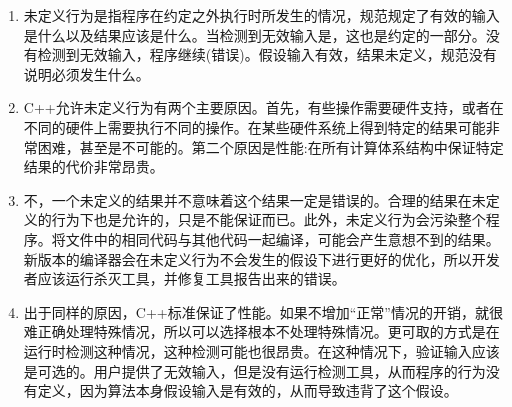 \begin{enumerate}
\item 
未定义行为是指程序在约定之外执行时所发生的情况，规范规定了有效的输入是什么以及结果应该是什么。当检测到无效输入是，这也是约定的一部分。没有检测到无效输入，程序继续(错误)。假设输入有效，结果未定义，规范没有说明必须发生什么。

\item 
C++允许未定义行为有两个主要原因。首先，有些操作需要硬件支持，或者在不同的硬件上需要执行不同的操作。在某些硬件系统上得到特定的结果可能非常困难，甚至是不可能的。第二个原因是性能:在所有计算体系结构中保证特定结果的代价非常昂贵。

\item 
不，一个未定义的结果并不意味着这个结果一定是错误的。合理的结果在未定义的行为下也是允许的，只是不能保证而已。此外，未定义行为会污染整个程序。将文件中的相同代码与其他代码一起编译，可能会产生意想不到的结果。新版本的编译器会在未定义行为不会发生的假设下进行更好的优化，所以开发者应该运行杀灭工具，并修复工具报告出来的错误。

\item
出于同样的原因，C++标准保证了性能。如果不增加“正常”情况的开销，就很难正确处理特殊情况，所以可以选择根本不处理特殊情况。更可取的方式是在运行时检测这种情况，这种检测可能也很昂贵。在这种情况下，验证输入应该是可选的。用户提供了无效输入，但是没有运行检测工具，从而程序的行为没有定义，因为算法本身假设输入是有效的，从而导致违背了这个假设。

\end{enumerate}